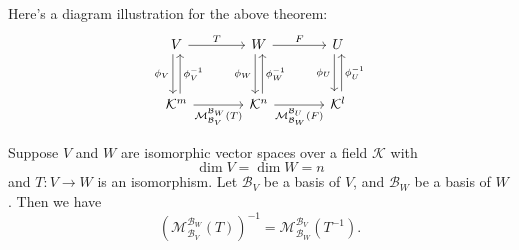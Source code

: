 	\begin{remarkenv}
		Here's a diagram illustration for the above theorem:
		\[
		\begin{tikzcd}[row sep=large, column sep=large]
		V
		\arrow[r, "T"]
		\arrow[d, xshift=-0.6ex, "\phi_V"']
		& W
		\arrow[r, "F"]
		\arrow[d, xshift=-0.6ex, "\phi_W"']
		& U
		\arrow[d, xshift=-0.6ex, "\phi_U"']
		\\
		\mathcal{K}^m
		\arrow[r, "\mathcal{M}^{\mathcal{B}_W}_{\mathcal{B}_V}(T)"']
		\arrow[u, xshift=0.6ex, "\phi_V^{-1}" ']
		& \mathcal{K}^n
		\arrow[r, "\mathcal{M}^{\mathcal{B}_U}_{\mathcal{B}_W}(F)"']
		\arrow[u, xshift=0.6ex, "\phi_W^{-1}"']
		& \mathcal{K}^l
		\arrow[u, xshift=0.6ex, "\phi_U^{-1}"']
		\end{tikzcd}
		\]
	\end{remarkenv}
	\begin{propositionenv}
		Suppose $V$ and $W$ are isomorphic vector spaces over a field $\mathcal{K}$ with
		\[
		\dim V = \dim W = n
		\]
		and $T: V \to W$ is an isomorphism. Let $\mathcal{B}_V$ be a basis of $V$, and $\mathcal{B}_W$ be a basis of $W$. Then we have
		\[
		\left( \mathcal{M}^{\mathcal{B}_W}_{\mathcal{B}_V}(T) \right)^{-1} =
		\mathcal{M}^{\mathcal{B}_V}_{\mathcal{B}_W}(T^{-1}).
		\]
	\end{propositionenv}
